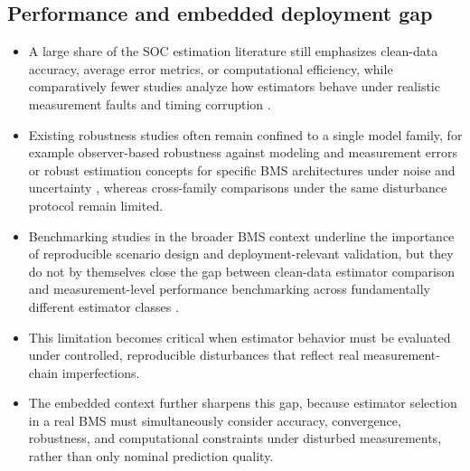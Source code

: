 \documentclass[review,nopreprintline]{elsarticle}
\begin{document}
\subsection{Performance and embedded deployment gap}
\begin{itemize}[leftmargin=*]
    \item A large share of the SOC estimation literature still emphasizes clean-data accuracy, average error metrics, or computational efficiency, while comparatively fewer studies analyze how estimators behave under realistic measurement faults and timing corruption \cite{shrivastavaReviewTechnologicalAdvancement2023,Embedded_AI_only_SOC_mobile,giazitzisCaseStudyTiny2024,mazziStateChargeEstimation2022}.
    \item Existing robustness studies often remain confined to a single model family, for example observer-based robustness against modeling and measurement errors \cite{liRobustnessSOCEstimation2015} or robust estimation concepts for specific BMS architectures under noise and uncertainty \cite{naseriReliableWirelessBMS2025}, whereas cross-family comparisons under the same disturbance protocol remain limited.
    \item Benchmarking studies in the broader BMS context underline the importance of reproducible scenario design and deployment-relevant validation, but they do not by themselves close the gap between clean-data estimator comparison and measurement-level performance benchmarking across fundamentally different estimator classes \cite{bergerBenchmarkingBatteryManagement2024}.
    \item This limitation becomes critical when estimator behavior must be evaluated under controlled, reproducible disturbances that reflect real measurement-chain imperfections.
    \item The embedded context further sharpens this gap, because estimator selection in a real BMS must simultaneously consider accuracy, convergence, robustness, and computational constraints under disturbed measurements, rather than only nominal prediction quality.
\end{itemize}
\end{document}
